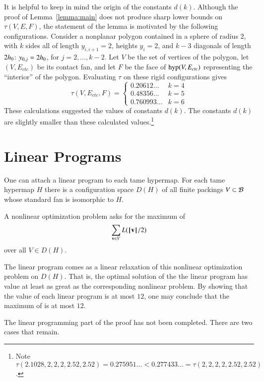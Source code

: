 \begin{remark}
It is helpful to keep in mind the origin of the constants $d(k)$.
Although the proof of Lemma~\ref{lemma:main} does not produce sharp lower bounds on $\tau(V,E,F)$, the
statement of the lemma is motivated by the following configurations.
Consider a nonplanar polygon contained in a sphere of radius $2$, with $k$ sides all of length $y_{i,i+1}=2$, heights
$y_i=2$, and $k-3$ diagonals of length $2{h_0}$: $y_{0,j}=2{h_0}$, for
$j=2,\ldots,k-2$.  Let $V$ be the set of vertices of the polygon, let $(V,E_{ctc})$ be its contact fan, and let $F$ be the face of ${\operatorname{hyp}}(V,E_{ctc})$ representing the ``interior'' of the polygon.  Evaluating $\tau$ on these rigid configurations gives
$$
\tau(V,E_{ctc},F) = \begin{cases}
0.20612\ldots & k=4\\
0.48356\ldots & k=5\\
0.760993\ldots &k=6
\end{cases}
$$
These calculations suggested the values of constants $d(k)$.  The constants $d(k)$ are slightly smaller than these calculated values.\footnote{Note $\tau(2.1028,2,2,2,2.52,2.52) = 0.275951\ldots < 0.277433\ldots = \tau(2,2,2,2,2.52,2.52)$.}
%
%
%
\end{remark}


\section{Linear Programs}

One can attach a linear program to each tame hypermap.
For each tame hypermap $H$ there is a configuration space $D(H)$ of all
finite packings $V\subset {\mathcal B}$ whose standard fan is
isomorphic to $H$.
%
%

A nonlinear optimization problem asks for the maximum of
\begin{equation}\label{eqn:L2}
\sum_{{\mathbf v}\in V} L({{\hskip0.1em|\hskip-0.15em|\hskip0.1em}{\mathbf v}{\hskip0.1em|\hskip-0.15em|\hskip0.1em}}/2)
\end{equation}
over all $V\in D(H)$.

The linear program comes as a linear relaxation of this nonlinear
optimization problem on $D(H)$. That is, the optimal solution of the
the linear program has value at least as great as the corresponding
nonlinear problem.  By showing that the value of each linear program
is at most $12$, one may conclude that the maximum of 
is at most $12$.


\begin{note}%
The linear programming part of the proof has not been completed. There are two cases that remain.
\end{note}

